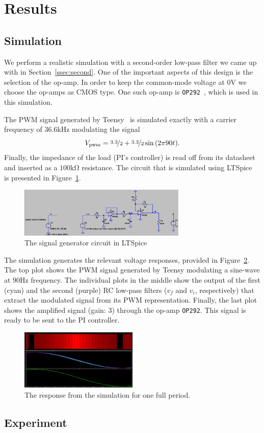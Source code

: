 \section{Results}

\subsection{Simulation}

We perform a realistic simulation with a second-order low-pass filter we came up
with in Section~\ref{ssec:second}. One of the important aspects of this design
is the selection of the op-amp. In order to keep the common-mode voltage at
$0$\unit{\volt} we choose the op-amps as CMOS type. One such op-amp is
\texttt{OP292}~\cite{op292}, which is used in this simulation.

The PWM signal generated by Teensy~\cite{teensy} is simulated exactly with a
carrier frequency of $36.6$\unit{\kilo\hertz} modulating the signal \[
V_{\text{pwm}} = \nicefrac{3.3}{2} + \nicefrac{3.3}{2}\sin{(2\pi 90 t)}.\]
Finally, the impedance of the load (PI's controller) is read off from its
datasheet and inserted as a $100$\unit{\kilo\ohm} resistance. The circuit that
is simulated using LTSpice~\cite{ltspice} is presented in
Figure~\ref{fig:real_sig_gen}.

\begin{figure}[htb] 
\includegraphics[width=8cm]{./figures/circuit.png}
\caption{The signal generator circuit in LTSpice} 
\label{fig:real_sig_gen}
\end{figure}

The simulation generates the relevant voltage responses, provided in
Figure~\ref{fig:response}. The top plot shows the PWM signal generated by Teensy
modulating a sine-wave at $90$\unit{\hertz} frequency. The individual plots in
the middle show the output of the first (cyan) and the second (purple) RC
low-pass filters ($v_f$ and $v_i$, respectively) that extract the modulated
signal from its PWM representation. Finally, the last plot shows the amplified
signal (gain: $3$) through the op-amp \texttt{OP292}. This signal is ready to be
sent to the PI controller.

\begin{figure}[t]
\includegraphics[width=0.5\textwidth]{./figures/pwm_filtered_one_two_final_signal.png}
\caption{The response from the simulation for one full period.} 
\label{fig:response}
\end{figure}


\subsection{Experiment}
